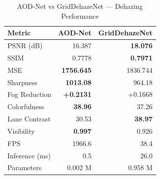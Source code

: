 \begin{table}[h]
\centering
\caption{AOD-Net vs GridDehazeNet — Dehazing Performance}
\label{tab:comparison}
\begin{tabular}{lrr}
\hline
\textbf{Metric} & \textbf{AOD-Net} & \textbf{GridDehazeNet} \\
\hline
PSNR (dB) & 16.387 & \textbf{18.076} \\
SSIM & 0.7778 & \textbf{0.7971} \\
MSE & \textbf{1756.645} & 1836.744 \\
Sharpness & \textbf{1013.08} & 964.18 \\
Fog Reduction & \textbf{+0.2131} & +0.1668 \\
Colorfulness & \textbf{38.96} & 37.26 \\
Lane Contrast & 30.53 & \textbf{38.97} \\
Visibility & \textbf{0.997} & 0.926 \\
\hline
FPS & 1966.6 & 38.4 \\
Inference (ms) & 0.5 & 26.0 \\
Parameters & 0.002 M & 0.958 M \\
\hline
\end{tabular}
\end{table}
